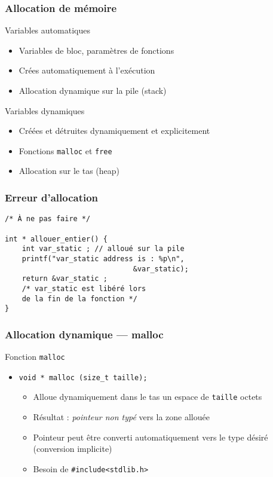\documentclass[table,handout,tikz,12pt,svgnames]{beamer}
\subtitle{\Huge Allocation Dynamique}
\date{CM3}
\begin{document}
\begin{frame}
	\titlepage
\end{frame}

\begin{frame}[fragile=singleslide]
	\frametitle{Allocation de mémoire}
		\begin{block}{Variables automatiques} %
			\begin{itemize}
                \item Variables de bloc, paramètres de fonctions
			\item Crées automatiquement à l'exécution
            \item Allocation dynamique sur la pile (stack)
			\end{itemize}
		\end{block}
		\begin{block}{Variables dynamiques} %
			\begin{itemize}
			\item Créées et détruites dynamiquement et explicitement
			\item Fonctions \texttt{malloc} et \texttt{free}
			\item Allocation sur le tas (heap)
			\end{itemize}
		\end{block}
\end{frame}

\begin{frame}[fragile=singleslide]
	\frametitle{Erreur d'allocation }
\begin{verbatim}
/* À ne pas faire */	

int * allouer_entier() {
	int var_static ; // alloué sur la pile
	printf("var_static address is : %p\n",
							  &var_static);
	return &var_static ;
    /* var_static est libéré lors
    de la fin de la fonction */
}			
\end{verbatim}
\end{frame}

\begin{frame}[fragile=singleslide]
	\frametitle{Allocation dynamique --- malloc}
		\begin{block}{Fonction \texttt{malloc}} %
			\begin{itemize}
				\item \texttt{void * malloc (size\_t taille);}
				\begin{itemize}
					\item Alloue dynamiquement dans le tas un espace de \texttt{taille} octets
					\item Résultat : \textit{pointeur non typé} vers la zone allouée
					\item Pointeur peut être converti automatiquement vers le type désiré (conversion implicite)
					\item Besoin de \texttt{\#include<stdlib.h>}
				\end{itemize}
			\end{itemize}
		\end{block}
\end{frame}
\end{document}
